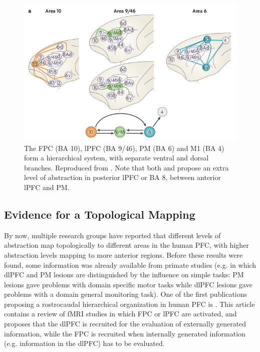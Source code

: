\documentclass[10pt,a4paper]{report}
\begin{document}
\begin{figure}[bthp]
\begin{center}
\includegraphics[width=\textwidth]{figures/PFChierarchy.png}
\caption{ The FPC (BA 10), lPFC (BA 9/46), PM (BA 6) and M1 (BA 4) form a hierarchical system, with separate ventral and dorsal branches. Reproduced from \citet{Badre2009}. Note that both \citet{Koechlin2007} and \citet{Badre2007} propose an extra level of abstraction in posterior lPFC or BA 8, between anterior lPFC and PM.}
\label{PFCHierarchy}
\end{center}
\end{figure}


\subsection*{Evidence for a Topological Mapping}

By now, multiple research groups have reported that different levels of abstraction map topologically to different areas in the human PFC, with higher abstraction levels mapping to more anterior regions. Before these results were found, some information was already available from primate studies (e.g. \citet{Petrides1991} in which dlPFC and PM lesions are distinguished by the influence on simple tasks: PM lesions gave problems with domain specific motor tasks while dlPFC lesions gave problems with a domain general monitoring task). One of the first publications proposing a rostrocaudal hierarchical organization in human PFC is \citet{Christoff2000}. This article contains a review of fMRI studies in which FPC or lPFC are activated, and proposes that the dlPFC is recruited for the evaluation of externally generated information, while the FPC is recruited when internally generated information (e.g. information in the dlPFC) has to be evaluated.
\end{document}
